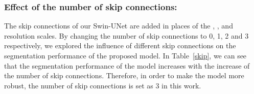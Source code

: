 \documentclass[runningheads]{llncs}
\begin{document}
\begin{table}[t!]
\caption{Ablation study on the impact of the number of skip connection}\label{skip}
\footnotesize
{}
\centering
\end{table}

\subsubsection{Effect of the number of skip connections:}
\label{skip_num}

The skip connections of our Swin-UNet are added in places of the , , and  resolution scales. By changing the number of skip connections to 0, 1, 2 and 3 respectively, we explored the influence of different skip connections on the segmentation performance of the proposed model. In Table~\ref{skip}, we can see that the segmentation performance of the model increases with the increase of the number of skip connections. Therefore, in order to make the model more robust, the number of skip connections is set as 3 in this work.



\begin{table}[t!]
\caption{Ablation study on the impact of the input size}\label{input}
\footnotesize
{}
\centering
\end{table}
\end{document}
